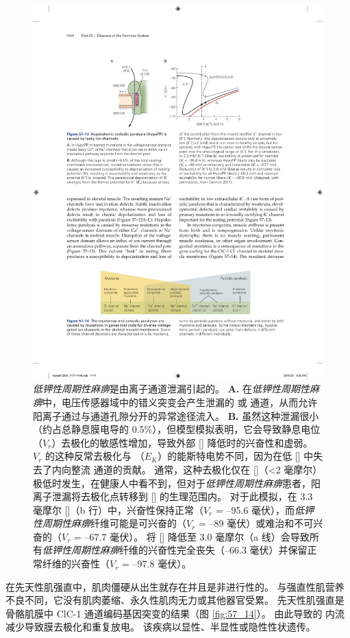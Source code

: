\begin{figure}[htbp]
	\centering
	\includegraphics[width=0.77\linewidth]{chap57/fig_57_13}
	\caption{\textit{低钾性周期性麻痹}是由离子通道泄漏引起的。
		\textbf{A.} 在\textit{低钾性周期性麻痹}中，电压传感器域中的错义突变会产生泄漏的  或  通道，从而允许阳离子通过与通道孔隙分开的异常途径流入。
		\textbf{B.} 虽然这种泄漏很小（约占总静息膜电导的 0.5\%），但模型模拟表明，它会导致静息电位（$V_r$）去极化的敏感性增加，导致外部 [] 降低时的兴奋性和虚弱。
		$V_r$ 的这种反常去极化与 （$E_K$）的能斯特电势不同，因为在低 [] 中失去了内向整流  通道的贡献。
		通常，这种去极化仅在 []（<2 毫摩尔）极低时发生，在健康人中看不到，但对于\textit{低钾性周期性麻痹}患者，阳离子泄漏将去极化点转移到 [] 的生理范围内。
		对于此模拟，在 3.3 毫摩尔 []（b 行）中，兴奋性保持正常（$V_r$ = –95.6 毫伏），而\textit{低钾性周期性麻痹}纤维可能是可兴奋的（$V_r$ = –89 毫伏）或难治和不可兴奋的（$V_r$ = –67.7 毫伏）。
		将 [] 降低至 3.0 毫摩尔（a 线）会导致所有\textit{低钾性周期性麻痹}纤维的兴奋性完全丧失（–66.3 毫伏）并保留正常纤维的兴奋性（$V_r$ = –97.8 毫伏）\cite{cannon2018sodium}。}
	\label{fig:57_13}
\end{figure}


在先天性肌强直中，肌肉僵硬从出生就存在并且是非进行性的。
与强直性肌营养不良不同，它没有肌肉萎缩、永久性肌肉无力或其他器官受累。
先天性肌强直是骨骼肌膜中 ClC-1  通道编码基因突变的结果（图 \ref{fig:57_14}）。
由此导致的  内流减少导致膜去极化和重复放电。
该疾病以显性、半显性或隐性性状遗传。


